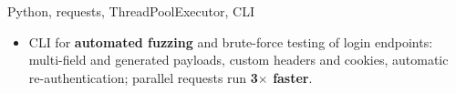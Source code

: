 {}
{Python, requests, ThreadPoolExecutor, CLI}
{\begin{itemize}
  \item CLI for \textbf{automated fuzzing} and brute-force testing of login endpoints: multi-field and generated payloads, custom headers and cookies, automatic re-authentication; parallel requests run \textbf{3$\times$ faster}.
\end{itemize}}
